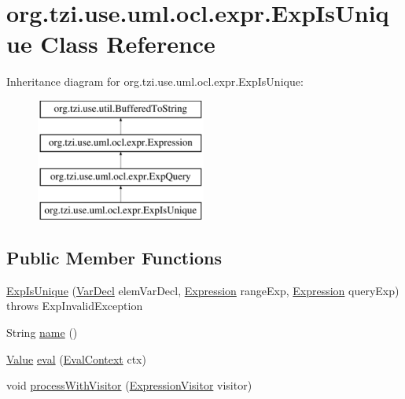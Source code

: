 \hypertarget{classorg_1_1tzi_1_1use_1_1uml_1_1ocl_1_1expr_1_1_exp_is_unique}{\section{org.\-tzi.\-use.\-uml.\-ocl.\-expr.\-Exp\-Is\-Unique Class Reference}
\label{classorg_1_1tzi_1_1use_1_1uml_1_1ocl_1_1expr_1_1_exp_is_unique}
}
Inheritance diagram for org.\-tzi.\-use.\-uml.\-ocl.\-expr.\-Exp\-Is\-Unique\-:\begin{figure}[H]
\begin{center}
\leavevmode
\includegraphics[height=4.000000cm]{classorg_1_1tzi_1_1use_1_1uml_1_1ocl_1_1expr_1_1_exp_is_unique}
\end{center}
\end{figure}
\subsection*{Public Member Functions}
\begin{DoxyCompactItemize}
\item 
\hyperlink{classorg_1_1tzi_1_1use_1_1uml_1_1ocl_1_1expr_1_1_exp_is_unique_a2ff1e4fbde86ba842e1879309f9a1401}{Exp\-Is\-Unique} (\hyperlink{classorg_1_1tzi_1_1use_1_1uml_1_1ocl_1_1expr_1_1_var_decl}{Var\-Decl} elem\-Var\-Decl, \hyperlink{classorg_1_1tzi_1_1use_1_1uml_1_1ocl_1_1expr_1_1_expression}{Expression} range\-Exp, \hyperlink{classorg_1_1tzi_1_1use_1_1uml_1_1ocl_1_1expr_1_1_expression}{Expression} query\-Exp)  throws Exp\-Invalid\-Exception     
\item 
String \hyperlink{classorg_1_1tzi_1_1use_1_1uml_1_1ocl_1_1expr_1_1_exp_is_unique_a56611227b831c13f03c3abf07be25c6b}{name} ()
\item 
\hyperlink{classorg_1_1tzi_1_1use_1_1uml_1_1ocl_1_1value_1_1_value}{Value} \hyperlink{classorg_1_1tzi_1_1use_1_1uml_1_1ocl_1_1expr_1_1_exp_is_unique_ab34a6849e4964be002fe3156237bc019}{eval} (\hyperlink{classorg_1_1tzi_1_1use_1_1uml_1_1ocl_1_1expr_1_1_eval_context}{Eval\-Context} ctx)
\item 
void \hyperlink{classorg_1_1tzi_1_1use_1_1uml_1_1ocl_1_1expr_1_1_exp_is_unique_ae7091a91c21e3dea755971f78d6c09c3}{process\-With\-Visitor} (\hyperlink{interfaceorg_1_1tzi_1_1use_1_1uml_1_1ocl_1_1expr_1_1_expression_visitor}{Expression\-Visitor} visitor)
\end{DoxyCompactItemize}
